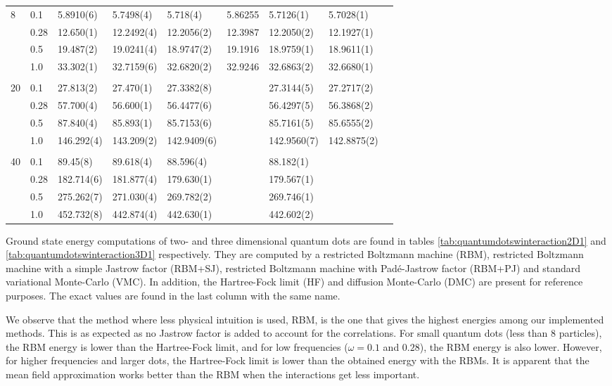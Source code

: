{\begin{landscape}
\begin{table}
\begin{tabularx}{\hsize}{llR{2.65cm}R{2.65cm}R{2.65cm}R{2.65cm}R{2.65cm}R{2.65cm}R{2.65cm}}
				8 & 0.1 & 5.8910(6) & 5.7498(4) & 5.718(4) & 5.86255 & 5.7126(1) & 5.7028(1) \\ 
				& 0.28 & 12.650(1) & 12.2492(4) & 12.2056(2) & 12.3987 & 12.2050(2) & 12.1927(1) \\
				& 0.5 & 19.487(2) & 19.0241(4) & 18.9747(2) & 19.1916 & 18.9759(1) & 18.9611(1) \\
				& 1.0 & 33.302(1) & 32.7159(6) & 32.6820(2) & 32.9246 & 32.6863(2) & 32.6680(1) \\ 
				\hline \\
				
				20 & 0.1 & 27.813(2) & 27.470(1) & 27.3382(8) & & 27.3144(5) & 27.2717(2) \\ 
				& 0.28 & 57.700(4) & 56.600(1) & 56.4477(6) & & 56.4297(5) & 56.3868(2) \\
				& 0.5 & 87.840(4) & 85.893(1) & 85.7153(6) & & 85.7161(5) & 85.6555(2) \\
				& 1.0 & 146.292(4) & 143.209(2) & 142.9409(6) & & 142.9560(7) & 142.8875(2) \\ \hline \\
				
				40 & 0.1 & 89.45(8) & 89.618(4) & 88.596(4) & & 88.182(1) \\ 
				& 0.28 & 182.714(6) & 181.877(4) & 179.630(1) & & 179.567(1) \\
				& 0.5 & 275.262(7) & 271.030(4) & 269.782(2) & & 269.746(1) \\
				& 1.0 & 452.732(8) & 442.874(4) & 442.630(1) & & 442.602(2) \\ \hline\hline
			\end{tabularx}
		\end{table}
	\end{landscape}
}

Ground state energy computations of two- and three dimensional quantum dots are found in tables \eqref{tab:quantumdotswinteraction2D1} and \eqref{tab:quantumdotswinteraction3D1} respectively. They are computed by a restricted Boltzmann machine (RBM), restricted Boltzmann machine with a simple Jastrow factor (RBM+SJ), restricted Boltzmann machine with Padé-Jastrow factor (RBM+PJ) and standard variational Monte-Carlo (VMC). In addition, the Hartree-Fock limit (HF) and diffusion Monte-Carlo (DMC) are present for reference purposes. The exact values are found in the last column with the same name. 

We observe that the method where less physical intuition is used, RBM, is the one that gives the highest energies among our implemented methods. This is as expected as no Jastrow factor is added to account for the correlations. For small quantum dots (less than 8 particles), the RBM energy is lower than the Hartree-Fock limit, and for low frequencies ($\omega=0.1$ and $0.28$), the RBM energy is also lower. However, for higher frequencies and larger dots, the Hartree-Fock limit is lower than the obtained energy with the RBMs. It is apparent that the mean field approximation works better than the RBM when the interactions get less important. 

